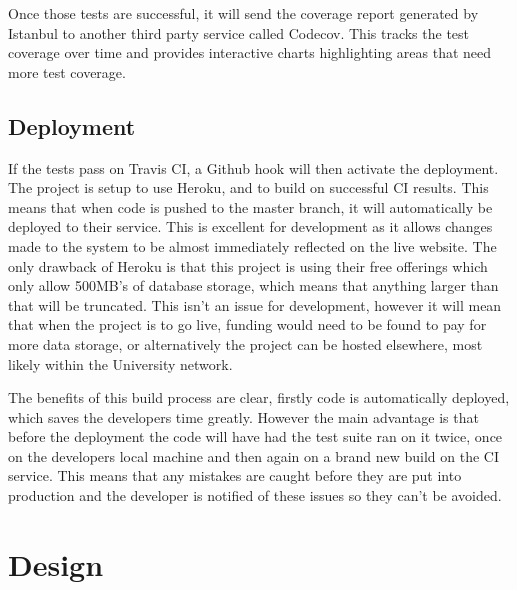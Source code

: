     Once those tests are successful, it will send the coverage report generated by Istanbul to another third party service called Codecov\cite{codecov}. This tracks the test coverage over time and provides interactive charts highlighting areas that need more test coverage. 

  \subsection{Deployment}
  If the tests pass on Travis CI, a Github hook will then activate the deployment. The project is setup to use Heroku\cite{heroku}, and to build on successful CI results. This means that when code is pushed to the master branch, it will automatically be deployed to their service. This is excellent for development as it allows changes made to the system to be almost immediately reflected on the live website. The only drawback of Heroku is that this project is using their free offerings which only allow 500MB's of database storage, which means that anything larger than that will be truncated. This isn't an issue for development, however it will mean that when the project is to go live, funding would need to be found to pay for more data storage, or alternatively the project can be hosted elsewhere, most likely within the University network.

  The benefits of this build process are clear, firstly code is automatically deployed, which saves the developers time greatly. However the main advantage is that before the deployment the code will have had the test suite ran on it twice, once on the developers local machine and then again on a brand new build on the CI service. This means that any mistakes are caught before they are put into production and the developer is notified of these issues so they can't be avoided. 
\section{Design}
% 
% 
% 

